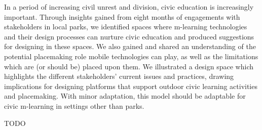 In a period of increasing civil unrest and division, civic education is increasingly important.  Through insights gained from eight months of engagements with stakeholders in local parks, we identified spaces where m-learning technologies and their design processes can nurture civic education and produced suggestions for designing in these spaces. We also gained and shared an understanding of the potential placemaking role mobile technologies can play, as well as the limitations which are (or should be) placed upon them. 
We illustrated a design space which highlights the different stakeholders’ current issues and practices, drawing implications for designing platforms that support outdoor civic learning activities and placemaking. With minor adaptation, this model should be adaptable for civic m-learning in settings other than parks.

TODO